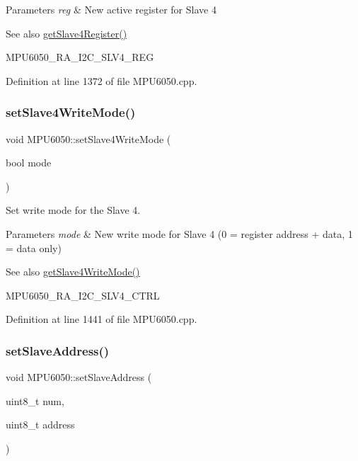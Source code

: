 \begin{DoxyParams}{Parameters}
{\em reg} & New active register for Slave 4 \\
\hline
\end{DoxyParams}
\begin{DoxySeeAlso}{See also}
\mbox{\hyperlink{classMPU6050_a7bd548cb60ecceb27c72f026ec0a60f8}{get\+Slave4\+Register()}} 

M\+P\+U6050\+\_\+\+R\+A\+\_\+\+I2\+C\+\_\+\+S\+L\+V4\+\_\+\+R\+EG 
\end{DoxySeeAlso}


Definition at line 1372 of file M\+P\+U6050.\+cpp.

\mbox{\label{classMPU6050_af1402fe7f3e1cc0dedb6714351cbca4e}} 
\subsubsection{\texorpdfstring{setSlave4WriteMode()}{setSlave4WriteMode()}}
{\footnotesize\ttfamily void M\+P\+U6050\+::set\+Slave4\+Write\+Mode (\begin{DoxyParamCaption}\item[{bool}]{mode }\end{DoxyParamCaption})}



Set write mode for the Slave 4. 


\begin{DoxyParams}{Parameters}
{\em mode} & New write mode for Slave 4 (0 = register address + data, 1 = data only) \\
\hline
\end{DoxyParams}
\begin{DoxySeeAlso}{See also}
\mbox{\hyperlink{classMPU6050_a8d5a5e73907c78960154b92656127372}{get\+Slave4\+Write\+Mode()}} 

M\+P\+U6050\+\_\+\+R\+A\+\_\+\+I2\+C\+\_\+\+S\+L\+V4\+\_\+\+C\+T\+RL 
\end{DoxySeeAlso}


Definition at line 1441 of file M\+P\+U6050.\+cpp.

\mbox{\label{classMPU6050_a3c07eb2c59fff3ddc7186319ee40ba6f}} 
\subsubsection{\texorpdfstring{setSlaveAddress()}{setSlaveAddress()}}
{\footnotesize\ttfamily void M\+P\+U6050\+::set\+Slave\+Address (\begin{DoxyParamCaption}\item[{uint8\+\_\+t}]{num,  }\item[{uint8\+\_\+t}]{address }\end{DoxyParamCaption})}



